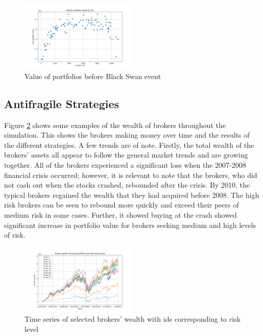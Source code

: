 \documentclass[letterpaper, 11 pt, proceedings]{IEEEtran}
\begin{document}
	\begin{figure}[h]
		\centering
		\includegraphics[width=0.5\textwidth]{interimRiskToValue.png}
		\caption{Value of portfolios before Black Swan event}
		\label{interimRV}
	\end{figure}
	\FloatBarrier

	\subsection{Antifragile Strategies}\label{subsec:results_end}	
	
	Figure \ref{ts_03-12} shows some examples of the wealth of brokers throughout the simulation. This shows the brokers making money over time and the results of the different strategies. A few trends are of note. Firstly, the total wealth of the brokers' assets all appear to follow the general market trends and are growing together. All of the brokers experienced a significant loss when the 2007-2008 financial crisis occurred; however, it is relevant to note that the brokers, who did not cash out when the stocks crashed, rebounded after the crisis. By 2010, the typical brokers regained the wealth that they had acquired before 2008. The high risk brokers can be seen to rebound more quickly and exceed their peers of medium risk in some cases. Further, it showed buying at the crash showed significant increase in portfolio value for brokers seeking medium and high levels of risk.
	
	\begin{figure}[h]
		\centering
		\includegraphics[width=0.5\textwidth]{timeSeriesJoint2.png}
		\caption{Time series of selected brokers' wealth with ids corresponding to risk level}
		\label{ts_03-12}
	\end{figure}
	\FloatBarrier
\end{document}
